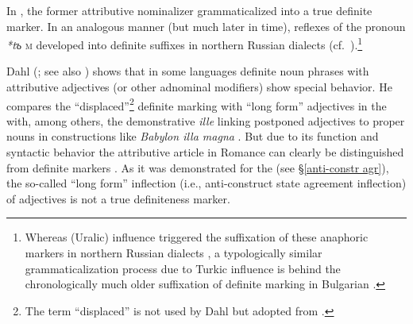 {%
In , the former attributive nominalizer grammaticalized into a true definite marker. In an analogous manner (but much later in time), reflexes of the  pronoun \textit{*tъ} \textsc{m} developed into definite suffixes in northern Russian dialects (cf.~\citealt
{leinonen2006a}).\footnote{Whereas  (Uralic) influence triggered the suffixation of these anaphoric markers in northern Russian dialects \citep
{leinonen2006a}, a typologically similar grammaticalization process due to Turkic influence is behind the chronologically much older suffixation of definite marking in Bulgarian \citep[114–122]{kusmenko2008}.}

Dahl (\citeyear[149–152]{dahl2003}; see also \citealt[122–123]{dahl2015a}) shows that in some languages definite noun phrases with attributive adjectives (or other adnominal modifiers) show special behavior. He compares the “displaced”\footnote{The term “displaced” is not used by Dahl but adopted from \citet[114–116]{melcuk2006}.} definite marking with “long form” adjectives in the  with, among others, the demonstrative \textit{ille} linking postponed adjectives to proper nouns in  constructions like \textit{Babylon illa magna} \citep[150]{dahl2003}. But due to its function and syntactic behavior the attributive article in Romance can clearly be distinguished from definite markers \citep[329]{gamillscheg1937}. As it was demonstrated for the  (see \S\ref{anti-constr agr}), the so-called “long form” inflection (i.e., anti\hyp{}construct state agreement inflection) of adjectives is not a true definiteness marker.

}

